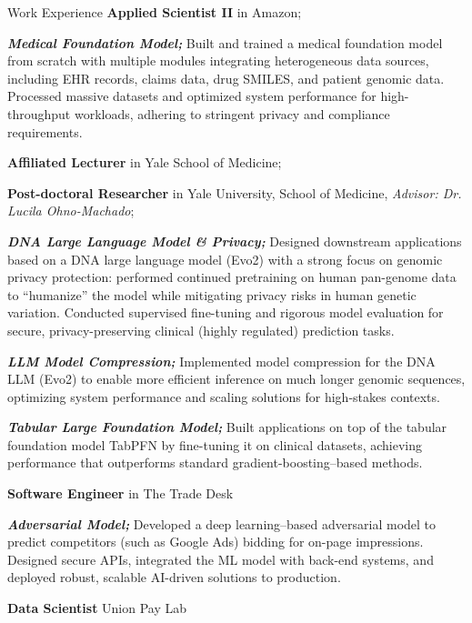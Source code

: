 \begin{rubric}{Work Experience}
%
	\textbf{Applied Scientist II} in Amazon;
  
   \textbf{\textit{Medical Foundation Model;}} Built and trained a medical foundation model from scratch with multiple modules integrating heterogeneous data sources, including EHR records, claims data, drug SMILES, and patient genomic data. Processed massive datasets and optimized system performance for high-throughput workloads, adhering to stringent privacy and compliance requirements.
   
%
	\textbf{Affiliated Lecturer} in Yale School of Medicine;



%
	\textbf{Post-doctoral Researcher} in  Yale University, School of Medicine, \emph{Advisor: Dr. Lucila Ohno-Machado}; 
  
   \textbf{\textit{DNA Large Language Model \& Privacy;}} Designed downstream applications based on a DNA large language model (Evo2) with a strong focus on genomic privacy protection: performed continued pretraining on human pan-genome data to “humanize” the model while mitigating privacy risks in human genetic variation. Conducted supervised fine-tuning and rigorous model evaluation for secure, privacy-preserving clinical (highly regulated) prediction tasks.
 
  \textbf{\textit{LLM Model Compression;}} Implemented model compression for the DNA LLM (Evo2) to enable more efficient inference on much longer genomic sequences, optimizing system performance and scaling solutions for high-stakes contexts.
  
 \textbf{\textit{Tabular Large Foundation Model;}} Built applications on top of the tabular foundation model TabPFN by fine-tuning it on clinical datasets, achieving performance that outperforms standard gradient-boosting–based methods.


%
	\textbf{Software Engineer} in The Trade Desk
    
\textbf{\textit{Adversarial Model;}} Developed a deep learning–based adversarial model to predict competitors (such as Google Ads) bidding for on-page impressions. Designed secure APIs, integrated the ML model with back-end systems, and deployed robust, scalable AI-driven solutions to production.


%
	\textbf{Data Scientist} Union Pay Lab 
	

\end{rubric}

